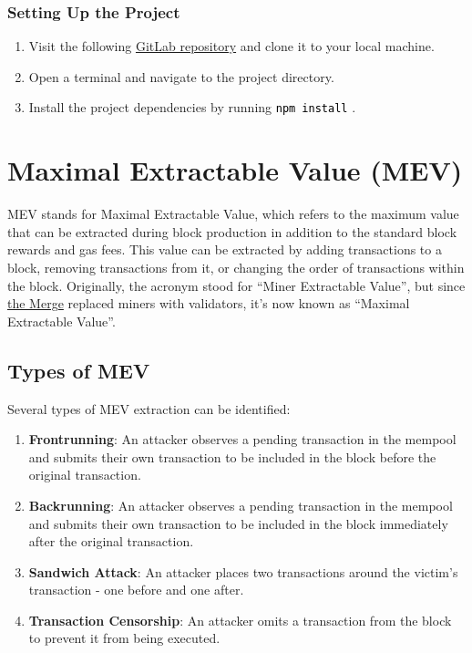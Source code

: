 \documentclass[12pt]{article}
\newcommand{\codegrey}[1]{%
  \texttt{\colorbox{black!4}{\textcolor{black}{#1}}}%
}
\begin{document}
\subsubsection*{Setting Up the Project}

\begin{enumerate}
    \item Visit the following \href{https://gitlab.fel.cvut.cz/radovluk/smart-contracts-exercises/-/tree/main/08-Maximal-Extractable-Value/task/task-code}{GitLab repository} and clone it to your local machine.
    \item Open a terminal and navigate to the project directory.
    \item Install the project dependencies by running \codegrey{npm install}.
\end{enumerate}

\section{Maximal Extractable Value (MEV)}

MEV stands for Maximal Extractable Value, which refers to the maximum value that can be extracted during block production in addition to the standard block rewards and gas fees. This value can be extracted by adding transactions to a block, removing transactions from it, or changing the order of transactions within the block. Originally, the acronym stood for ``Miner Extractable Value'', but since \href{https://ethereum.org/en/roadmap/merge/}{the Merge} replaced miners with validators, it's now known as ``Maximal Extractable Value''.

\subsection*{Types of MEV}

Several types of MEV extraction can be identified:

\begin{enumerate}
  \item \textbf{Frontrunning}: An attacker observes a pending transaction in the mempool and submits their own transaction to be included in the block before the original transaction.
  \item \textbf{Backrunning}: An attacker observes a pending transaction in the mempool and submits their own transaction to be included in the block immediately after the original transaction.
  \item \textbf{Sandwich Attack}: An attacker places two transactions around the victim's transaction - one before and one after.
  \item \textbf{Transaction Censorship}: An attacker omits a transaction from the block to prevent it from being executed.
\end{enumerate}
\end{document}
